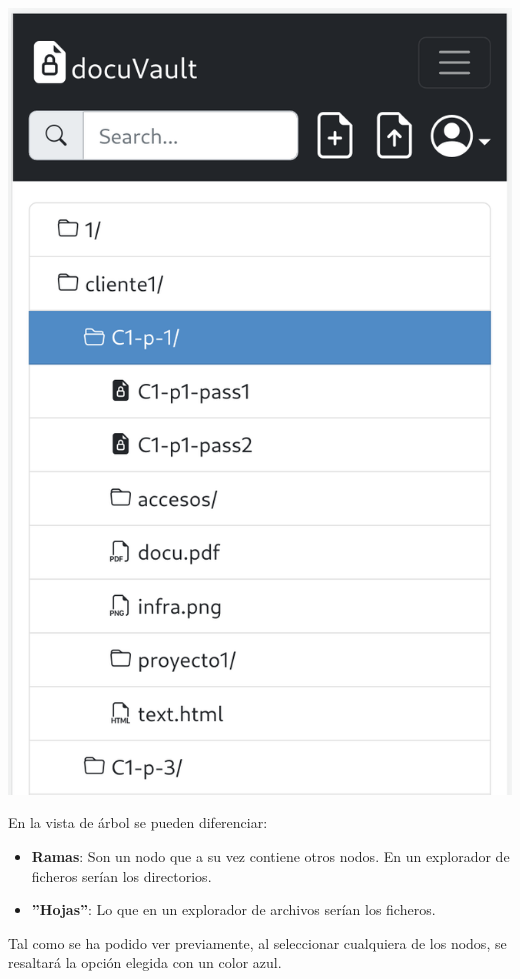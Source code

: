 \documentclass{\ClassPath/viu-tfm-template}
\begin{document}
{\begin{minipage}{0.3\linewidth}
    \includegraphics[width=\linewidth]{img/tree3.png}
\end{minipage}
}

En la vista de árbol se pueden diferenciar:

\begin{itemize}
    \item \textbf{Ramas}: Son un nodo que a su vez contiene otros nodos. En un explorador de ficheros serían los directorios.
    \item \textbf{”Hojas”}: Lo que en un explorador de archivos serían los ficheros.
\end{itemize}

Tal como se ha podido ver previamente, al seleccionar cualquiera de los nodos, se resaltará la opción elegida con un color azul.
\end{document}
